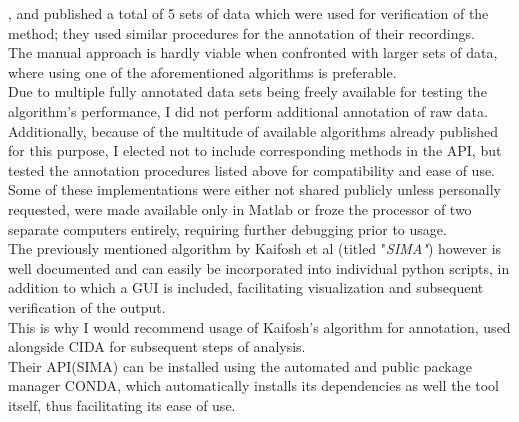 \documentclass[titlepage]{article}
\begin{document}
\citeauthor{dana_sensitive_2016}, \citeauthor{chen_ultrasensitive_2013} and \citeauthor{akerboom_optimization_2012} published a total of 5 sets of data which were used for verification of the method; they used similar procedures for the annotation of their recordings.\\
The manual approach is hardly viable when confronted with larger sets of data, where using one of the aforementioned algorithms is preferable.\\
Due to multiple fully annotated data sets being freely available for testing the algorithm's performance, I did not perform additional annotation of raw data.\\
Additionally, because of the multitude of available algorithms already published for this purpose, I elected not to include corresponding methods in the API, but tested the annotation procedures listed above for compatibility and ease of use.\\
Some of these implementations were either not shared publicly unless personally requested\cite{pachitariu_extracting_2013}\cite{smith_parallel_2010}\cite{maruyama_detecting_2014}, were made available  only in Matlab\cite{mukamel_automated_2009}\cite{tomek_two-photon_2013} or froze the processor of two separate computers entirely, requiring further debugging prior to usage\cite{pnevmatikakis_simultaneous_2016}.\\
The previously mentioned algorithm by Kaifosh et al \cite{kaifosh_sima:_2014} (titled "\emph{SIMA"}) however is well documented and can easily be incorporated into individual python scripts, in addition to which a GUI is included, facilitating visualization and subsequent verification of the output.\\
This is why I would recommend usage of Kaifosh's algorithm for annotation, used alongside CIDA for subsequent steps of analysis.\\
Their API(SIMA) can be installed using the automated and public package manager CONDA\cite{noauthor_conda_nodate}, which automatically installs its dependencies as well the tool itself, thus facilitating its ease of use.\\
\end{document}
